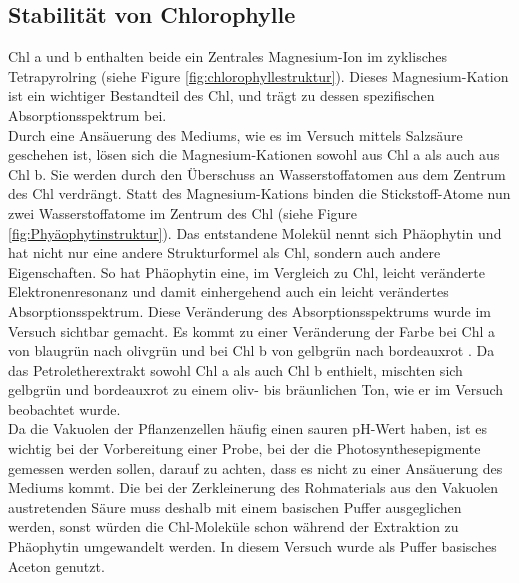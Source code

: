 \documentclass[10pt,a4paper]{article}
\begin{document}
		\subsection{Stabilität von Chlorophylle}
		
			Chl a und b enthalten beide ein Zentrales Magnesium-Ion im zyklisches Tetrapyrolring (siehe Figure \ref{fig:chlorophyllestruktur}).  Dieses Magnesium-Kation ist ein wichtiger Bestandteil des Chl, und trägt zu dessen spezifischen Absorptionsspektrum bei. \\
			Durch eine Ansäuerung des Mediums, wie es im Versuch mittels Salzsäure geschehen ist, lösen sich die Magnesium-Kationen sowohl aus Chl a als auch aus Chl b. Sie werden durch den Überschuss an Wasserstoffatomen aus dem Zentrum des Chl verdrängt. Statt des Magnesium-Kations binden die Stickstoff-Atome nun zwei Wasserstoffatome im Zentrum des Chl (siehe Figure \ref{fig:Phyäophytinstruktur}). Das entstandene Molekül nennt sich Phäophytin und hat nicht nur eine andere Strukturformel als Chl, sondern auch andere Eigenschaften. So hat Phäophytin eine, im Vergleich zu Chl, leicht veränderte Elektronenresonanz und damit einhergehend auch ein leicht verändertes Absorptionsspektrum. Diese Veränderung des Absorptionsspektrums wurde im Versuch sichtbar gemacht. Es kommt zu einer Veränderung der Farbe bei Chl a von blaugrün nach olivgrün und bei Chl b von gelbgrün nach bordeauxrot \cite{Chlorophyllestruktur}. Da das Petroletherextrakt sowohl Chl a als auch Chl b enthielt, mischten sich gelbgrün und bordeauxrot zu einem oliv- bis bräunlichen Ton, wie er im Versuch beobachtet wurde. \\
			Da die Vakuolen der Pflanzenzellen häufig einen sauren pH-Wert haben, ist es wichtig bei der Vorbereitung einer Probe, bei der die Photosynthesepigmente gemessen werden sollen, darauf zu achten, dass es nicht zu einer Ansäuerung des Mediums kommt. Die bei der Zerkleinerung des Rohmaterials aus den Vakuolen austretenden Säure muss deshalb mit einem basischen Puffer ausgeglichen werden, sonst würden die Chl-Moleküle schon während der Extraktion zu Phäophytin umgewandelt werden. In diesem Versuch wurde als Puffer basisches Aceton genutzt.\\
		
\end{document}
